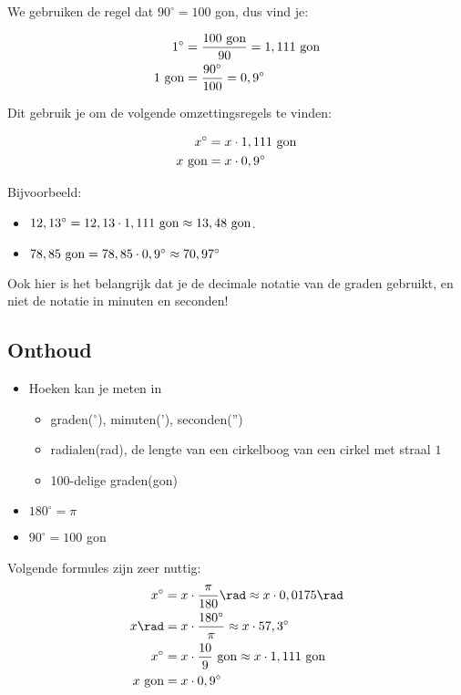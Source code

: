 \documentclass[a4paper,12pt]{article}
\begin{document}
We gebruiken de regel dat $90^\circ=100$ gon, dus vind je:
\begin{framed}
\begin{align*}
1^\circ &= \frac{100 \textup{ gon}}{90}= 1,111 \textup{ gon}\\
1 \textup{ gon} &= \frac{90^\circ}{100} = 0,9^\circ
\end{align*}
\end{framed}
Dit gebruik je om de volgende omzettingsregels te vinden:
\begin{framed}
\begin{align*}
x^\circ &= x\cdot 1,111 \textup{ gon}\\
x \textup{ gon} &= x\cdot 0,9^\circ
\end{align*}
\end{framed}
Bijvoorbeeld:
\begin{itemize}
	\item $12,13^\circ = 12,13 \cdot 1,111 \textup{ gon} \approx 13,48 \textup{ gon}$.
	\item $78,85 \textup{ gon} = 78,85 \cdot 0,9^\circ \approx 70,97^\circ$
\end{itemize}

Ook hier is het belangrijk dat je de decimale notatie van de graden gebruikt, en niet de notatie in minuten en seconden!

\subsection{Onthoud}
\begin{framed}
\begin{itemize}
	\item Hoeken kan je meten in
	
\begin{itemize}
	\item graden($^\circ$), minuten('), seconden('')
	\item radialen(rad), de lengte van een cirkelboog van een cirkel met straal $1$
	\item 100-delige graden(gon)
\end{itemize}
\item $180^\circ=\pi$
\item $90^\circ=100$ gon
\end{itemize}

Volgende formules zijn zeer nuttig:
\begin{align*}
x^\circ &= x\cdot \frac{\pi}{180} \rad \approx x\cdot 0,0175 \rad\\
x \rad &= x \cdot \frac{180^\circ}{\pi} \approx x \cdot 57,3^\circ\\
x^\circ &= x \cdot \frac{10}{9} \textup{ gon} \approx x \cdot 1,111 \textup{ gon}\\
x \textup{ gon} &= x\cdot 0,9^\circ
\end{align*}
\end{framed}
\end{document}
